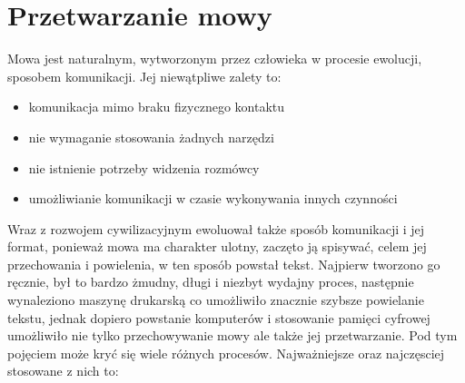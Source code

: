 \section{Przetwarzanie mowy}
Mowa jest naturalnym, wytworzonym przez człowieka w procesie ewolucji, sposobem komunikacji. Jej niewątpliwe zalety to:
\begin{itemize}
	\item komunikacja mimo braku fizycznego kontaktu
	\item nie wymaganie stosowania żadnych narzędzi
	\item nie istnienie potrzeby widzenia rozmówcy
	\item umożliwianie komunikacji w czasie wykonywania innych czynności
\end{itemize}
Wraz z rozwojem cywilizacyjnym ewoluował także sposób komunikacji i jej format, ponieważ mowa ma charakter ulotny, zaczęto ją spisywać, celem jej przechowania i powielenia, w ten sposób powstał tekst. Najpierw tworzono go ręcznie, był to bardzo żmudny, długi i niezbyt wydajny proces, następnie wynaleziono maszynę drukarską co umożliwiło znacznie szybsze powielanie tekstu, jednak dopiero powstanie komputerów i stosowanie pamięci cyfrowej umożliwiło nie tylko przechowywanie mowy ale także jej przetwarzanie. Pod tym pojęciem może kryć się wiele różnych procesów. Najważniejsze oraz najczęsciej stosowane z nich to:
